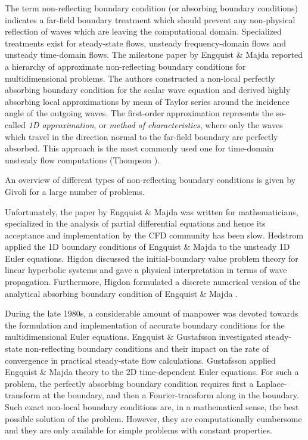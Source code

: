  The term non-reflecting boundary condition (or absorbing boundary conditions)
 indicates a far-field boundary treatment which should prevent any
 non-physical reflection of waves which are leaving
 the computational domain.
 Specialized treatments exist for steady-state flows, unsteady
 frequency-domain flows and unsteady time-domain flows.
 The milestone paper by Engquist \& Majda \citeyear{Engquist:1} reported
 a hierarchy of approximate non-reflecting boundary conditions for
 multidimensional problems. The authors constructed a non-local
 perfectly absorbing boundary condition for the scalar wave equation
 and derived highly absorbing local approximations by mean of Taylor 
 series around the incidence angle of the outgoing waves.
 The first-order approximation represents the so-called {\em 1D
 approximation}, or {\em method of characteristics},
 where only the waves which travel in the direction normal to the
 far-field boundary are perfectly absorbed.
 This approach is the most commonly used one for time-domain
 unsteady flow computations (Thompson ).
 
 An overview of different types of non-reflecting boundary conditions
 is given by Givoli \citeyear{Givoli:1} for a large number of problems.

 Unfortunately, the paper by Engquist \& Majda \citeyear{Engquist:1}
 was written for mathematicians,
 specialized in the analysis of partial differential equations and hence
 its acceptance and implementation by the CFD community has been slow.
 Hedstrom \citeyear{Hedstrom:1} applied the 1D
 boundary conditions of Engquist \& Majda to the unsteady 1D
 Euler equations.
 Higdon \citeyear{Higdon:1} discussed the initial-boundary value problem
 theory for linear hyperbolic systems and gave a physical interpretation
 in terms of wave propagation. Furthermore, Higdon \citeyear{Higdon:2,Higdon:3} 
 formulated a discrete numerical version of the analytical absorbing boundary
 condition of Engquist \& Majda \citeyear{Engquist:1}.

 During the late 1980s, a considerable amount of manpower was devoted towards
 the formulation and implementation of accurate boundary conditions for the
 multidimensional Euler equations.
 Engquist \& Gustafsson \citeyear{Engquist:2} investigated steady-state
 non-reflecting boundary conditions and their impact on the rate of
 convergence in practical steady-state flow calculations.
 Gustafsson \citeyear{Gustafsson:1} applied Engquist \& Majda \citeyear{Engquist:1}
 theory to the 2D time-dependent Euler equations.
 For such a problem, the perfectly absorbing boundary condition
 requires first a Laplace-transform at the boundary, and then
 a Fourier-transform along in the boundary.
 Such exact non-local boundary conditions are, in a mathematical
 sense, the best possible solution of the problem. However,
 they are computationally cumbersome and they are only
 available for simple problems with constant properties.
 
